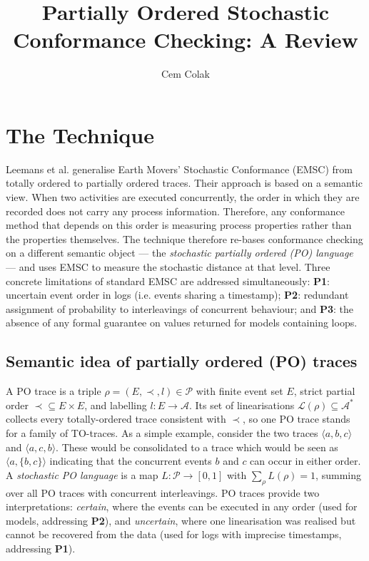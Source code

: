 \documentclass[runningheads]{llncs}
\begin{document}
\title{Partially Ordered Stochastic Conformance Checking: A Review}

\author{Cem Colak}

\maketitle

\section{The Technique}
Leemans et al. \cite{poemsc} generalise Earth Movers' Stochastic Conformance (EMSC) from totally ordered to partially ordered traces. Their approach is based on a semantic view. When two activities are executed concurrently, the order in which they are recorded does not carry any process information. Therefore, any conformance method that depends on this order is measuring process properties rather than the properties themselves. The technique therefore re-bases conformance checking on a different semantic object — the \emph{stochastic partially ordered (PO) language} — and uses EMSC to measure the stochastic distance at that level. Three concrete limitations of standard EMSC are addressed simultaneously: \textbf{P1}: uncertain event order in logs (i.e. events sharing a timestamp); \textbf{P2}: redundant assignment of probability to interleavings of concurrent behaviour; and \textbf{P3}: the absence of any formal guarantee on values returned for models containing loops.

\subsection{Semantic idea of partially ordered (PO) traces}

A PO trace is a triple $\rho = (E, \prec, l) \in \mathcal{P} $ with finite event set $E$, strict partial order ${\prec} \subseteq E \times E$, and labelling $l\colon E \to \mathcal{A}$. Its set of linearisations $\mathcal{L}(\rho) \subseteq \mathcal{A}^{*}$ collects every totally-ordered trace consistent with $\prec$, so one PO trace stands for a family of TO-traces. As a simple example, consider the two traces $ \langle a, b, c \rangle $ and  $\langle a, c, b \rangle $. These would be consolidated to a trace which would be seen as $\langle a, \{b, c\} \rangle $ indicating that the concurrent events $b$ and $c$ can occur in either order. A \emph{stochastic PO language} is a map $L\colon \mathcal{P} \to [0,1]$ with $\sum_{\rho} L(\rho) = 1$, summing over all PO traces with concurrent interleavings. PO traces provide two interpretations: \emph{certain}, where the events can be executed in any order (used for models, addressing \textbf{P2}), and \emph{uncertain}, where one linearisation was realised but cannot be recovered from the data (used for logs with imprecise timestamps, addressing \textbf{P1}).
\end{document}

